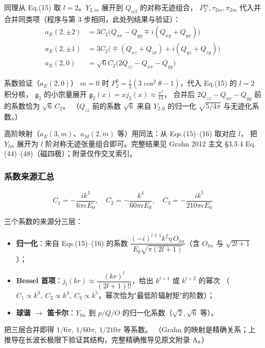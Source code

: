 同理从 Eq.(15) 取 $l=2$。$Y_{2,m}$ 展开到 $Q_{\alpha\beta}$ 的对称无迹组合，
$P_2^m,\tau_{2m},\pi_{2m}$ 代入并合并同类项（程序与第 3 步相同，此处列结果与验证）：
\begin{align}
  a_E(2,\pm2) &= 3C_2\bigl(Q_{xx} - Q_{yy} \mp i(Q_{xy}+Q_{yx})\bigr) \\
  a_E(2,\pm1) &= 3C_2\bigl(\mp(Q_{xz}+Q_{zx}) + i(Q_{yz}+Q_{zy})\bigr) \\
  a_E(2,0) &= \sqrt{6}C_2\bigl(2Q_{zz} - Q_{xx} - Q_{yy}\bigr)
\end{align}

\begin{stepbox}{系数验证（$a_E(2,0)$）}
$m=0$ 时 $P_2^0=\frac12(3\cos^2\theta-1)$，代入 Eq.(15) 的 $l=2$ 积分核，
$\mathfrak{g}_2$ 的小宗量展开 $\mathfrak{g}_2(x)=x j_2(x)\approx\frac{x^3}{15}$，
合并后 $2Q_{zz}-Q_{xx}-Q_{yy}$ 前的系数恰为 $\sqrt6\,C_2$。
（$Q_{zz}$ 前的系数 $\sqrt6$ 来自 $Y_{2,0}$ 的归一化 $\sqrt{5/4\pi}$ 与无迹化系数。）
\end{stepbox}

高阶映射（$a_E(3,m)$、$a_M(2,m)$ 等）用同法：从 Eqs.(15)--(16) 取对应 $l$，
把 $Y_{lm}$ 展开为 $l$ 阶对称无迹张量组合即可。完整结果见 Grahn 2012 主文 §3.3.4 Eq.(44)--(48)（磁四极）；附录仅作交叉索引。

\subsubsection{系数来源汇总}

\begin{equation}
  C_1 = -\frac{ik^3}{6\pi\epsilon E_0},\quad
  C_2 = -\frac{k^4}{60\pi\epsilon E_0},\quad
  C_3 = -\frac{ik^5}{210\pi\epsilon E_0}
\end{equation}

三个系数的来源分三层：
\begin{itemize}
  \item \textbf{归一化}：来自 Eqs.(15)--(16) 的系数
    $\dfrac{(-i)^{l\mp1}k^2\eta\,O_{lm}}{E_0\sqrt{\pi(2l+1)}}$（含 $O_{lm}$ 与 $\sqrt{2l+1}$）；
  \item \textbf{Bessel 首项}：$j_l(kr)\approx\dfrac{(kr)^l}{(2l+1)!!}$，给出 $k^{l+1}$ 或 $k^{l+2}$ 的幂次
    （$C_1\propto k^3,\ C_2\propto k^4,\ C_3\propto k^5$，幂次恰为"最低阶辐射矩"的阶数）；
  \item \textbf{球谐 $\to$ 笛卡尔}：$Y_{lm}$ 到 $p/Q/O$ 的归一化系数（$\sqrt2,\sqrt6$ 等）。
\end{itemize}
把三层合并即得 $1/6\pi,\ 1/60\pi,\ 1/210\pi$ 等系数。
（Grahn 的映射是精确关系；上推导在长波长极限下验证其结构，完整精确推导见原文附录 A。）

